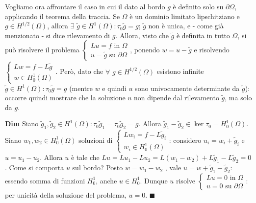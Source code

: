 \documentclass{article}
\begin{document}
Vogliamo ora affrontare il caso in cui il dato al bordo $g$ \`{e} definito
solo su $\partial \Omega $, applicando il teorema della traccia. Se $\Omega $
\`{e} un dominio limitato lipschitziano e $g\in H^{1/2}\left( \Omega \right) 
$, allora $\exists $ $\tilde{g}\in H^{1}\left( \Omega \right) :\tau _{0}%
\tilde{g}=g$; $\tilde{g}$ non \`{e} unica, e - come gi\`{a} menzionato - si
dice rilevamento di $g$. Allora, visto che $\tilde{g}$ \`{e} definita in
tutto $\Omega $, si pu\`{o} risolvere il problema $\left\{ 
\begin{array}{c}
Lu=f\text{ in }\Omega \\ 
u=\tilde{g}\text{ su }\partial \Omega%
\end{array}%
\right. $, ponendo $w=u-\tilde{g}$ e risolvendo $\left\{ 
\begin{array}{c}
Lw=f-L\tilde{g} \\ 
w\in H_{0}^{1}\left( \Omega \right)%
\end{array}%
\right. $. Per\`{o}, dato che $\forall $ $g\in H^{1/2}\left( \Omega \right) $
esistono infinite $\tilde{g}\in H^{1}\left( \Omega \right) :\tau _{0}\tilde{g%
}=g$ (mentre $w$ e quindi $u$ sono univocamente determinate da $\tilde{g}$):
occorre quindi mostrare che la soluzione $u$ non dipende dal rilevamento $%
\tilde{g}$, ma solo da $g$.

\textbf{Dim} Siano $\tilde{g}_{1},\tilde{g}_{2}\in H^{1}\left( \Omega
\right) :\tau _{0}\tilde{g}_{1}=\tau _{0}\tilde{g}_{2}=g$. Allora $\tilde{g}%
_{1}-\tilde{g}_{2}\in \ker \tau _{0}=H_{0}^{1}\left( \Omega \right) $. Siano 
$w_{1},w_{2}\in H_{0}^{1}\left( \Omega \right) $ soluzioni di $\left\{ 
\begin{array}{c}
Lw_{i}=f-L\tilde{g}_{i} \\ 
w_{i}\in H_{0}^{1}\left( \Omega \right)%
\end{array}%
\right. $: considero $u_{i}=w_{i}+\tilde{g}_{i}$ e $u=u_{1}-u_{2}$. Allora $%
u $ \`{e} tale che $Lu=Lu_{1}-Lu_{2}=L\left( w_{1}-w_{2}\right) +L\tilde{g}%
_{1}-L\tilde{g}_{2}=0$. Come si comporta $u$ sul bordo? Posto $w=w_{1}-w_{2}$%
, vale $u=w+\tilde{g}_{1}-\tilde{g}_{2}$: essendo somma di funzioni $%
H_{0}^{1}$, anche $u\in H_{0}^{1}$. Dunque $u$ risolve $\left\{ 
\begin{array}{c}
Lu=0\text{ in }\Omega \\ 
u=0\text{ su }\partial \Omega%
\end{array}%
\right. $: per unicit\`{a} della soluzione del problema, $u=0$. $%
\blacksquare $
\end{document}
